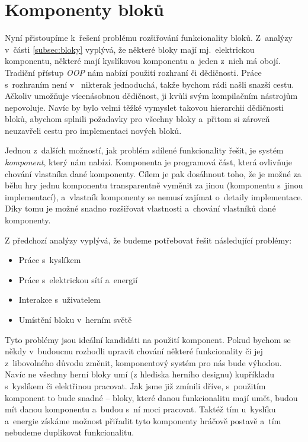 


\section{Komponenty bloků}
\label{sec:komponents}

Nyní přistoupíme k~řešení problému rozšiřování funkcionality bloků. Z~analýzy v~části \ref{subsec:bloky} vyplývá, že některé bloky mají mj.~elektrickou komponentu, některé mají kyslíkovou komponentu a~jeden z~nich má obojí. Tradiční přístup \textit{OOP} nám nabízí použití rozhraní či dědičnosti. Práce s~rozhraním není v~\UEu{} nikterak jednoduchá, takže bychom rádi našli snazší cestu. Ačkoliv \CPP{} umožňuje vícenásobnou dědičnost, \UE{} ji kvůli svým kompilačním nástrojům nepovoluje. Navíc by bylo velmi těžké vymyslet takovou hierarchii dědičnosti bloků, abychom splnili požadavky pro všechny bloky a~přitom si zároveň neuzavřeli cestu pro implementaci nových bloků. 

Jednou z~dalších možností, jak problém sdílené funkcionality řešit, je systém \textit{komponent}, který nám \UE{} nabízí. Komponenta je programová část, která ovlivňuje chování vlastníka dané komponenty. Cílem je pak dosáhnout toho, že je možné za běhu hry jednu komponentu transparentně vyměnit za jinou (komponentu s~jinou implementací), a~vlastník komponenty se nemusí zajímat o~detaily implementace. Díky tomu je možné snadno rozšiřovat vlastnosti a~chování vlastníků dané komponenty.

Z předchozí analýzy vyplývá, že budeme potřebovat řešit následující problémy:

\begin{itemize}
	\item Práce s~kyslíkem
	\item Práce s~elektrickou sítí a~energií
	\item Interakce s~uživatelem
	\item Umístění bloku v~herním světě
\end{itemize}


Tyto problémy jsou ideální kandidáti na použití komponent. Pokud bychom se někdy v~budoucnu rozhodli upravit chování některé funkcionality či jej z~libovolného důvodu změnit, komponentový systém pro nás bude výhodou. Navíc ne všechny herní bloky umí (z hlediska herního designu) kupříkladu s~kyslíkem či elektřinou pracovat. Jak jsme již zmínili dříve,  s~použitím komponent to bude snadné -- bloky, které danou funkcionalitu mají umět, budou mít danou komponentu a~budou s~ní moci pracovat. Taktéž tím u~kyslíku a~energie získáme možnost přiřadit tyto komponenty hráčově postavě a~tím nebudeme duplikovat funkcionalitu.


